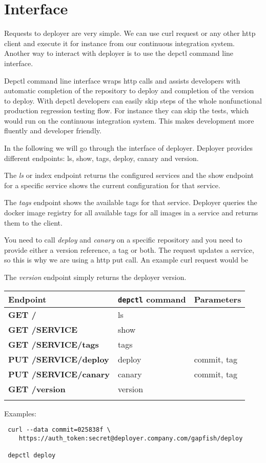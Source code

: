 \section{Interface}

Requests to deployer are very simple. We can use curl request or any other http client and
execute it for instance from our continuous integration system. Another way to interact
with deployer is to use the depctl command line interface.

Depctl command line interface wraps http calls and assists developers with automatic
completion of the repository to deploy and completion of the version to deploy. With
depctl developers can easily skip steps of the whole nonfunctional production regression
testing flow. For instance they can skip the tests, which would run on the continuous
integration system. This makes development more fluently and developer friendly.

In the following we will go through the interface of deployer. Deployer provides different
endpoints: ls, show, tags, deploy, canary and version.

The \emph{ls} or index endpoint returns the configured services and the show endpoint for a
specific service shows the current configuration for that service.

The \emph{tags} endpoint shows
the available tags for that service. Deployer queries the docker image registry for all
available tags for all images in a service and returns them to the client.

You need to call \emph{deploy} and \emph{canary} on a specific repository and you
need to provide either a version reference, a tag or both. The request updates a service, so
this is why we are using a http put call. An example curl request would be

The \emph{version}
endpoint simply returns the deployer version.

\begin{table}[!htbp]
  \begin{tabular}{ l|l|l }
    Endpoint & \texttt{depctl} command & Parameters \\
    \hline \hline
    \textbf{GET /} & ls & \\
    \textbf{GET /SERVICE} & show & \\
    \textbf{GET /SERVICE/tags} & tags & \\
    \textbf{PUT /SERVICE/deploy} & deploy & commit, tag \\
    \textbf{PUT /SERVICE/canary} & canary & commit, tag \\
    \textbf{GET /version} & version & \\
    \multicolumn{3}{l}{} %
  \end{tabular}

  Examples:

\begin{verbatim}
 curl --data commit=025838f \
    https://auth_token:secret@deployer.company.com/gapfish/deploy

 depctl deploy
\end{verbatim}
\end{table}

